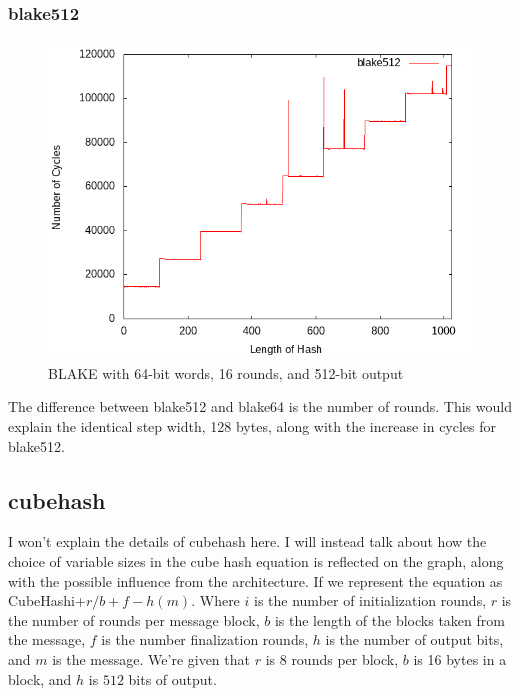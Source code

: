 \documentclass[10pt,a4paper]{article}
\begin{document}
\subsubsection{blake512}
    \begin{figure}[H]
        \begin{center}
            \includegraphics[scale=0.5]{images_fast_run/blake512.png} 
            \caption{BLAKE with 64-bit words, 16 rounds, and 512-bit output}
        \end{center}
    \end{figure}
The difference between blake512 and blake64 is the number of rounds. This would explain the identical step width, 128 bytes, along with the increase
in cycles for blake512. 

\subsection{cubehash}

I won't explain the details of cubehash here. I will instead talk about how the
choice of variable sizes in the cube hash equation is reflected on the graph,
along with the possible influence from the architecture. If we represent the
equation as CubeHashi+$r/b+f-h(m)$. Where $i$ is the number of initialization
rounds, $r$ is the number of rounds per message block, $b$ is the length of the
blocks taken from the message, $f$ is the number finalization rounds, $h$ is the
number of output bits, and $m$ is the message. We're given that $r$ is $8$ rounds per
block, $b$ is 16 bytes in a block, and $h$ is $512$ bits of output.
\end{document}
